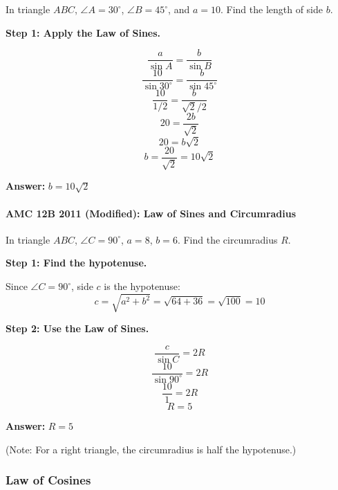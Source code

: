 ﻿\documentclass[12pt]{extarticle}
\begin{document}
In triangle $ABC$, $\angle A = 30^{\circ}$, $\angle B = 45^{\circ}$, and $a = 10$. Find the length of side $b$.

\begin{solutionbox}
\textbf{Step 1: Apply the Law of Sines.}

\[\frac{a}{\sin A} = \frac{b}{\sin B}\]
\[\frac{10}{\sin 30^{\circ}} = \frac{b}{\sin 45^{\circ}}\]
\[\frac{10}{1/2} = \frac{b}{\sqrt{2}/2}\]
\[20 = \frac{2b}{\sqrt{2}}\]
\[20 = b\sqrt{2}\]
\[b = \frac{20}{\sqrt{2}} = 10\sqrt{2}\]

\textbf{Answer:} $\boxed{b = 10\sqrt{2}}$
\end{solutionbox}

\paragraph{AMC 12B 2011 (Modified): Law of Sines and Circumradius}

In triangle $ABC$, $\angle C = 90^{\circ}$, $a = 8$, $b = 6$. Find the circumradius $R$.

\begin{solutionbox}
\textbf{Step 1: Find the hypotenuse.}

Since $\angle C = 90^{\circ}$, side $c$ is the hypotenuse:
\[c = \sqrt{a^2 + b^2} = \sqrt{64 + 36} = \sqrt{100} = 10\]

\textbf{Step 2: Use the Law of Sines.}

\[\frac{c}{\sin C} = 2R\]
\[\frac{10}{\sin 90^{\circ}} = 2R\]
\[\frac{10}{1} = 2R\]
\[R = 5\]

\textbf{Answer:} $\boxed{R = 5}$

(Note: For a right triangle, the circumradius is half the hypotenuse.)
\end{solutionbox}

\subsubsection{Law of Cosines}
\end{document}
